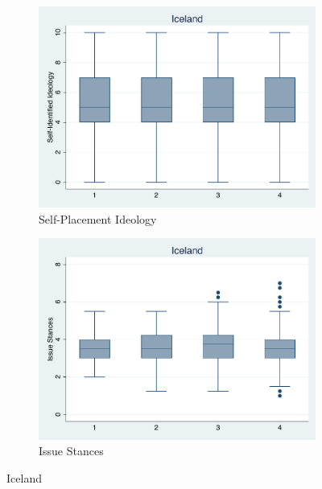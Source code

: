 \documentclass[12pt, titlepage]{article}
\begin{document}
\begin{figure}[H]
	\centering
	\begin{subfigure}[b]{0.475\textwidth}   
		\centering 
		\includegraphics[width=\textwidth]{IdeoBP/Iceland}
		\caption{Self-Placement Ideology}
	\end{subfigure}
	\hfill
	\begin{subfigure}[b]{0.475\textwidth}
		\centering 
		\includegraphics[width=\textwidth]{BoxLib/Iceland}
		\caption{Issue Stances}
	\end{subfigure}
	\caption{Iceland}
	\label{Iceland}
\end{figure}
\end{document}
